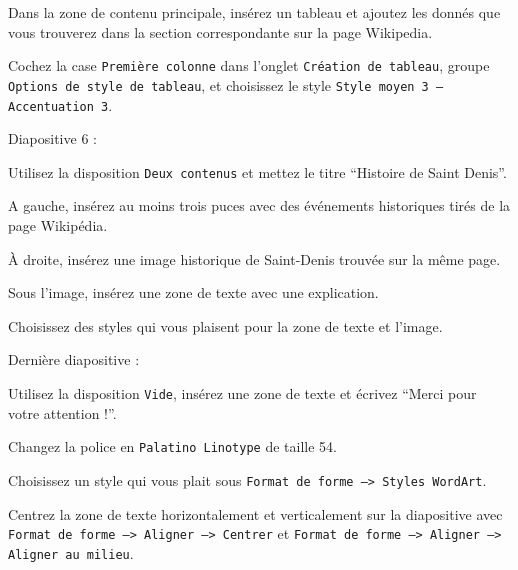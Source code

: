 \begin{questions}
\begin{parts}
\item Dans la zone de contenu principale, insérez un tableau et ajoutez les
donnés que vous trouverez dans la section correspondante sur la page Wikipedia.
\item Cochez la case \texttt{Première colonne} dans l'onglet \texttt{Création de
tableau}, groupe \texttt{Options de style de tableau}, et choisissez le style
\texttt{Style moyen 3 -- Accentuation 3}.
\end{parts}
\question Diapositive 6 : 
\begin{parts}
\item Utilisez la disposition \texttt{Deux contenus} et mettez le titre
``Histoire de Saint Denis''.
\item A gauche, insérez au moins trois puces avec des événements historiques
tirés de la page Wikipédia.
\item À droite, insérez une image historique de Saint-Denis trouvée sur la même
page.
\item Sous l'image, insérez une zone de texte avec une explication.
\item Choisissez des styles qui vous plaisent pour la zone de texte et l'image.
\end{parts}
\item Dernière diapositive :
\begin{parts}
\item Utilisez la disposition \texttt{Vide}, insérez une zone de texte et
écrivez ``{Merci pour votre attention !}''.
\item Changez la police en \texttt{Palatino Linotype} de taille 54.
\item Choisissez un style qui vous plait sous \texttt{Format de forme --> Styles
WordArt}.
\item Centrez la zone de texte horizontalement et verticalement sur la
diapositive avec \texttt{Format de forme --> Aligner --> Centrer} et
\texttt{Format de forme --> Aligner --> Aligner au milieu}.
\end{parts}
\end{questions}

